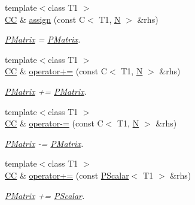 \begin{DoxyCompactItemize}
{\footnotesize template$<$class T1 $>$ }\\\mbox{\hyperlink{classENSEM_1_1PMatrix_a744bac549029029effe32dc1705660ec}{CC}} \& \mbox{\hyperlink{classENSEM_1_1PMatrix_ac3c0e489c8c8011edc4ea93477176b84}{assign}} (const C$<$ T1, \mbox{\hyperlink{adat__devel_2lib_2hadron_2operator__name__util_8cc_a7722c8ecbb62d99aee7ce68b1752f337}{N}} $>$ \&rhs)
\begin{DoxyCompactList}\small\item\em \mbox{\hyperlink{classENSEM_1_1PMatrix}{P\+Matrix}} = \mbox{\hyperlink{classENSEM_1_1PMatrix}{P\+Matrix}}. \end{DoxyCompactList}\item 
{\footnotesize template$<$class T1 $>$ }\\\mbox{\hyperlink{classENSEM_1_1PMatrix_a744bac549029029effe32dc1705660ec}{CC}} \& \mbox{\hyperlink{classENSEM_1_1PMatrix_af6bd651888f2621169845b757b2200ee}{operator+=}} (const C$<$ T1, \mbox{\hyperlink{adat__devel_2lib_2hadron_2operator__name__util_8cc_a7722c8ecbb62d99aee7ce68b1752f337}{N}} $>$ \&rhs)
\begin{DoxyCompactList}\small\item\em \mbox{\hyperlink{classENSEM_1_1PMatrix}{P\+Matrix}} += \mbox{\hyperlink{classENSEM_1_1PMatrix}{P\+Matrix}}. \end{DoxyCompactList}\item 
{\footnotesize template$<$class T1 $>$ }\\\mbox{\hyperlink{classENSEM_1_1PMatrix_a744bac549029029effe32dc1705660ec}{CC}} \& \mbox{\hyperlink{classENSEM_1_1PMatrix_a76fa178c64fa75b73925016654a08766}{operator-\/=}} (const C$<$ T1, \mbox{\hyperlink{adat__devel_2lib_2hadron_2operator__name__util_8cc_a7722c8ecbb62d99aee7ce68b1752f337}{N}} $>$ \&rhs)
\begin{DoxyCompactList}\small\item\em \mbox{\hyperlink{classENSEM_1_1PMatrix}{P\+Matrix}} -\/= \mbox{\hyperlink{classENSEM_1_1PMatrix}{P\+Matrix}}. \end{DoxyCompactList}\item 
{\footnotesize template$<$class T1 $>$ }\\\mbox{\hyperlink{classENSEM_1_1PMatrix_a744bac549029029effe32dc1705660ec}{CC}} \& \mbox{\hyperlink{classENSEM_1_1PMatrix_a141db586d4797230e05d41ab13c12a1e}{operator+=}} (const \mbox{\hyperlink{classENSEM_1_1PScalar}{P\+Scalar}}$<$ T1 $>$ \&rhs)
\begin{DoxyCompactList}\small\item\em \mbox{\hyperlink{classENSEM_1_1PMatrix}{P\+Matrix}} += \mbox{\hyperlink{classENSEM_1_1PScalar}{P\+Scalar}}. \end{DoxyCompactList}\item 

\end{DoxyCompactItemize}
